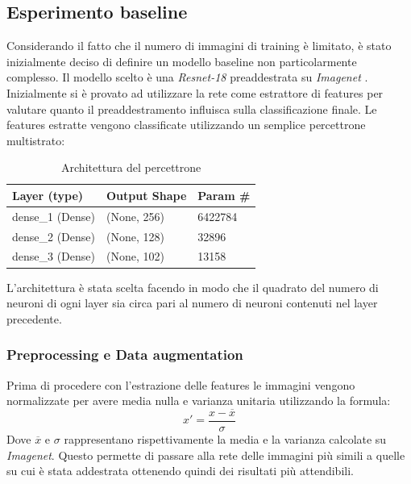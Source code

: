 \subsection{Esperimento baseline}
Considerando il fatto che il numero di immagini di training è limitato, è stato inizialmente deciso di definire un modello baseline non particolarmente complesso. Il modello scelto è una \textit{Resnet-18} \cite{he2015deep} preaddestrata su \textit{Imagenet} \cite{5206848}. Inizialmente si è provato ad utilizzare la rete come estrattore di features per valutare quanto il preaddestramento influisca sulla classificazione finale. 
Le features estratte vengono classificate utilizzando un semplice percettrone multistrato:
\begin{table}[H]
\centering
\caption{Architettura del percettrone}
\begin{tabular}{lll}
\hline
Layer (type)     & Output Shape & Param \# \\ \hline
dense\_1 (Dense) & (None, 256)  & 6422784  \\ \hline
dense\_2 (Dense) & (None, 128)  & 32896    \\ \hline
dense\_3 (Dense) & (None, 102)  & 13158    \\ \hline
\end{tabular}
\label{t_mlp}
\end{table}
L'architettura è stata scelta facendo in modo che il quadrato del numero di neuroni di ogni layer sia circa pari al numero di neuroni contenuti nel layer precedente.

\subsubsection{Preprocessing e Data augmentation}
Prima di procedere con l'estrazione delle features le immagini vengono normalizzate per avere media nulla e varianza unitaria utilizzando la formula:
\begin{equation}
x' = \frac{x - \overline{x}}{\sigma}
\end{equation}
Dove $ \overline{x} $ e $ \sigma $ rappresentano rispettivamente la media e la varianza calcolate su \textit{Imagenet}.
Questo permette di passare alla rete delle immagini più simili a quelle su cui è stata addestrata ottenendo quindi dei risultati più attendibili.
